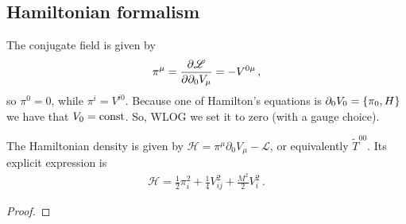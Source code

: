 \documentclass[main.tex]{subfiles}
\begin{document}

\subsection{Hamiltonian formalism}

The conjugate field is given by 
%
\begin{align}
\pi^{\mu } = \pdv{\mathscr{L}}{\partial_0 V_{\mu }} = - V^{0 \mu }
\,,
\end{align}
%
so \(\pi^{0} = 0\), while \(\pi^{i} = V^{i0}\). 
Because one of Hamilton's equations is \(\partial_0 V_0 = \qty{\pi_0, H}\) we have that \(V_0 = \text{const}\).
So, WLOG we set it to zero (with a gauge choice). 

\begin{claim}
The Hamiltonian density is given by \(\mathscr{H} = \pi^{\mu } \partial_0 V_{\mu } - \mathscr{L}\), or equivalently \(\widetilde{T}^{00}\). Its explicit expression is 
%
\begin{align}
    \mathscr{H} = \frac{1}{2} \pi_{i}^2 + \frac{1}{4} V_{ij}^2 + \frac{M^2}{2} V_{i}^2
    \,.
\end{align}
\end{claim}

\begin{proof}
\end{proof}
\end{document}
